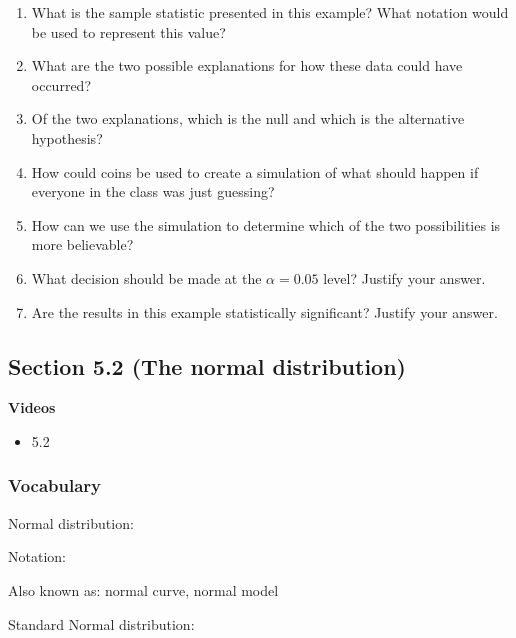 \documentclass[
]{report}
\providecommand{\tightlist}{%
  \setlength{\itemsep}{0pt}\setlength{\parskip}{0pt}}
\newcommand{\rgs}{\vspace{12pt}} %
\newcommand{\rgi}{\hspace{24pt}}  %
\begin{document}
\begin{enumerate}
\def\labelenumi{\arabic{enumi}.}
\item
  What is the sample statistic presented in this example? What notation would be used to represent this value?
  \rgs
\item
  What are the two possible explanations for how these data could have occurred?
  \rgs
\item
  Of the two explanations, which is the null and which is the alternative hypothesis?
  \rgs
\item
  How could coins be used to create a simulation of what should happen if everyone in the class was just guessing?
  \rgs
\item
  How can we use the simulation to determine which of the two possibilities is more believable?
  \rgs
\item
  What decision should be made at the \(\alpha = 0.05\) level? Justify your answer.
  \rgs
\item
  Are the results in this example statistically significant? Justify your answer.
  \rgs
\end{enumerate}

\hypertarget{section-5.2-the-normal-distribution}{%
\subsection*{Section 5.2 (The normal distribution)}\label{section-5.2-the-normal-distribution}}


\textbf{Videos}

\begin{itemize}
\tightlist
\item
  5.2
\end{itemize}


\hypertarget{vocabulary-11}{%
\subsubsection*{Vocabulary}\label{vocabulary-11}}

Normal distribution:
\rgs

\rgi Notation:
\rgs

\rgi Also known as: normal curve, normal model

\rgi Standard Normal distribution:
\rgs
\end{document}
